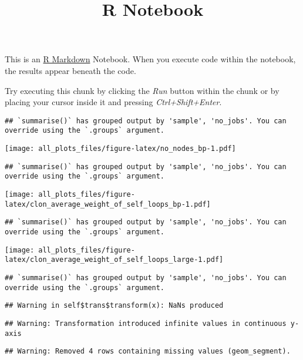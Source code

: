\documentclass[
]{article}
\title{R Notebook}
\author{}
\date{\vspace{-2.5em}}
\begin{document}
\maketitle

This is an \href{http://rmarkdown.rstudio.com}{R Markdown} Notebook.
When you execute code within the notebook, the results appear beneath
the code.

Try executing this chunk by clicking the \emph{Run} button within the
chunk or by placing your cursor inside it and pressing
\emph{Ctrl+Shift+Enter}.

\begin{verbatim}
## `summarise()` has grouped output by 'sample', 'no_jobs'. You can override using the `.groups` argument.
\end{verbatim}

\texttt{[image: all\_plots\_files/figure-latex/no\_nodes\_bp-1.pdf]}

\begin{verbatim}
## `summarise()` has grouped output by 'sample', 'no_jobs'. You can override using the `.groups` argument.
\end{verbatim}

\texttt{[image: all\_plots\_files/figure-latex/clon\_average\_weight\_of\_self\_loops\_bp-1.pdf]}

\begin{verbatim}
## `summarise()` has grouped output by 'sample', 'no_jobs'. You can override using the `.groups` argument.
\end{verbatim}

\texttt{[image: all\_plots\_files/figure-latex/clon\_average\_weight\_of\_self\_loops\_large-1.pdf]}

\begin{verbatim}
## `summarise()` has grouped output by 'sample', 'no_jobs'. You can override using the `.groups` argument.
\end{verbatim}

\begin{verbatim}
## Warning in self$trans$transform(x): NaNs produced
\end{verbatim}

\begin{verbatim}
## Warning: Transformation introduced infinite values in continuous y-axis
\end{verbatim}

\begin{verbatim}
## Warning: Removed 4 rows containing missing values (geom_segment).
\end{verbatim}
\end{document}

